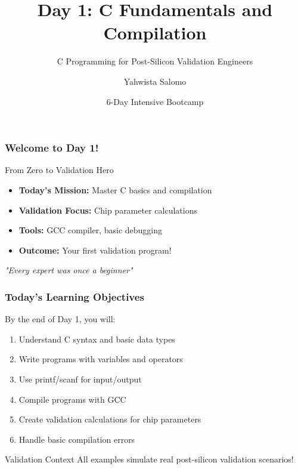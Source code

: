 \documentclass{beamer}
\title{Day 1: C Fundamentals and Compilation}
\subtitle{C Programming for Post-Silicon Validation Engineers}
\author{Yahwista Salomo}
\date{6-Day Intensive Bootcamp}
\institute{Post-Silicon Validation Training Program}
\begin{document}
\frame{\titlepage}

\begin{frame}
\frametitle{Welcome to Day 1!}
\begin{center}
\Large From Zero to Validation Hero
\end{center}

\begin{itemize}
    \item \textbf{Today's Mission:} Master C basics and compilation
    \item \textbf{Validation Focus:} Chip parameter calculations
    \item \textbf{Tools:} GCC compiler, basic debugging
    \item \textbf{Outcome:} Your first validation program!
\end{itemize}

\vspace{0.5cm}
\begin{center}
\textit{"Every expert was once a beginner"}
\end{center}
\end{frame}

\begin{frame}
\frametitle{Today's Learning Objectives}
By the end of Day 1, you will:

\begin{enumerate}
    \item Understand C syntax and basic data types
    \item Write programs with variables and operators
    \item Use printf/scanf for input/output
    \item Compile programs with GCC
    \item Create validation calculations for chip parameters
    \item Handle basic compilation errors
\end{enumerate}

\vspace{0.5cm}
\begin{alertblock}{Validation Context}
All examples simulate real post-silicon validation scenarios!
\end{alertblock}
\end{frame}
\end{document}

